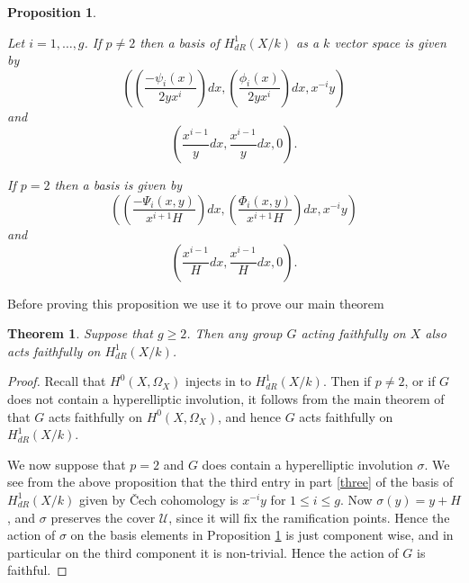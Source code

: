 \documentclass[draft, 11pt]{article} %
\theoremstyle{plain}
\newtheorem{thm}[defn]{Theorem}
\newtheorem{prop}[defn]{Proposition}
\theoremstyle{remark}
\newcommand{\cech}{\v{C}ech }
\begin{document}
\begin{prop}\label{basis}

Let $i=1,\ldots, g$. If $p\neq 2$ then a basis of $H^1_{dR}(X/k)$ as a $k$ vector space is given by
\begin{equation}\label{one}
 \left( \left( \frac{-\psi_i(x)}{2yx^i}\right) dx, \left(\frac{\phi_i(x)}{2yx^i}\right) dx, x^{-i}y\right)
\end{equation}
and
\begin{equation}\label{two}
 \left( \frac{x^{i-1}}{y} dx , \frac{x^{i-1}}{y} dx, 0 \right).
\end{equation}

If $p=2$ then a basis is given by
\begin{equation}\label{three}
\left( \left(\frac{-\Psi_i(x,y)}{x^{i+1}H}\right) dx, \left( \frac{\Phi_i(x,y)}{x^{i+1}H} \right) dx, x^{-i}y \right)
\end{equation}
and
\begin{equation}\label{four}
 \left( \frac{x^{i-1}}{H} dx, \frac{x^{i-1}}{H} dx, 0 \right).
\end{equation}

\end{prop}

Before proving this proposition we use it to prove our main theorem\\


\begin{thm}

Suppose that $g \geq 2$.
Then any group $G$ acting faithfully on $X$ also acts faithfully on $H^1_{dR}(X/k)$.

\end{thm}
\begin{proof}

Recall that $H^0(X,\Omega_X)$ injects in to $H^1_{dR}(X/k)$.
Then if $p \neq 2$, or if $G$ does not contain a hyperelliptic involution, it follows from the main theorem of \cite{faithfulaction} that $G$ acts faithfully on $H^0(X,\Omega_X)$, and hence $G$ acts faithfully on $H^1_{dR}(X/k)$.

We now suppose that $p=2$ and $G$ does contain a hyperelliptic involution $\sigma$.
We see from the above proposition that the third entry in part \eqref{three} of the basis of $H^1_{dR}(X/k)$ given by \cech cohomology is $x^{-i}y$ for $1 \leq i \leq g$.
Now $\sigma(y) = y+ H$, and $\sigma$ preserves the cover $\mathcal U$, since it will fix the ramification points.
Hence the action of $\sigma$ on the basis elements in Proposition \ref{basis} is just component wise, and in particular on the third component it is non-trivial.
Hence the action of $G$ is faithful.


\end{proof}
\end{document}
